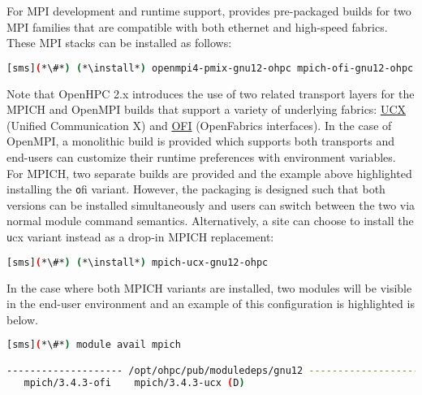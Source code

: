For MPI development and runtime support, \OHPC{} provides pre-packaged builds
for two MPI families that are compatible with both ethernet and high-speed
fabrics.  These MPI stacks can be installed as follows:

\begin{lstlisting}[language=bash]
[sms](*\#*) (*\install*) openmpi4-pmix-gnu12-ohpc mpich-ofi-gnu12-ohpc
\end{lstlisting}

Note that OpenHPC 2.x introduces the use of two related transport layers for
the MPICH and OpenMPI builds that support a variety of underlying
fabrics: \href{https://www.openucx.org}{UCX} (Unified Communication X)
and \href{https://ofiwg.github.io/libfabric/}{OFI} (OpenFabrics interfaces).
In the case of OpenMPI, a monolithic build is provided which supports both
transports and end-users can customize their runtime preferences with
environment variables. For MPICH, two separate builds are provided and the
example above highlighted installing the {\texttt ofi} variant.  However, the
packaging is designed such that both versions can be installed simultaneously
and users can switch between the two via normal module command
semantics. Alternatively, a site can choose to install the {\texttt ucx} variant
instead as a drop-in MPICH replacement:

\begin{lstlisting}[language=bash]
[sms](*\#*) (*\install*) mpich-ucx-gnu12-ohpc
\end{lstlisting}

In the case where both MPICH variants are installed, two modules will be
visible in the end-user environment and an example of this configuration is
highlighted is below. 

\begin{lstlisting}[language=bash]
[sms](*\#*) module avail mpich

-------------------- /opt/ohpc/pub/moduledeps/gnu12 ---------------------
   mpich/3.4.3-ofi    mpich/3.4.3-ucx (D)
\end{lstlisting}






